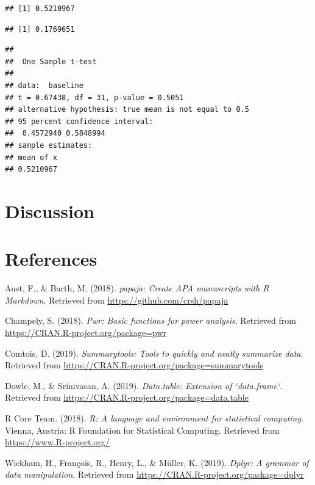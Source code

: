\documentclass[man]{apa6}
\begin{document}
\begin{verbatim}
## [1] 0.5210967
\end{verbatim}

\begin{verbatim}
## [1] 0.1769651
\end{verbatim}

\begin{verbatim}
## 
##  One Sample t-test
## 
## data:  baseline
## t = 0.67438, df = 31, p-value = 0.5051
## alternative hypothesis: true mean is not equal to 0.5
## 95 percent confidence interval:
##  0.4572940 0.5848994
## sample estimates:
## mean of x 
## 0.5210967
\end{verbatim}

\section{Discussion}\label{discussion}

\newpage

\section{References}\label{references}

\begingroup
\setlength{\parindent}{-0.5in} \setlength{\leftskip}{0.5in}

\hypertarget{refs}{}
\hypertarget{ref-R-papaja}{}
Aust, F., \& Barth, M. (2018). \emph{papaja: Create APA manuscripts with
R Markdown}. Retrieved from \url{https://github.com/crsh/papaja}

\hypertarget{ref-R-pwr}{}
Champely, S. (2018). \emph{Pwr: Basic functions for power analysis}.
Retrieved from \url{https://CRAN.R-project.org/package=pwr}

\hypertarget{ref-R-summarytools}{}
Comtois, D. (2019). \emph{Summarytools: Tools to quickly and neatly
summarize data}. Retrieved from
\url{https://CRAN.R-project.org/package=summarytools}

\hypertarget{ref-R-data.table}{}
Dowle, M., \& Srinivasan, A. (2019). \emph{Data.table: Extension of
`data.frame`}. Retrieved from
\url{https://CRAN.R-project.org/package=data.table}

\hypertarget{ref-R-base}{}
R Core Team. (2018). \emph{R: A language and environment for statistical
computing}. Vienna, Austria: R Foundation for Statistical Computing.
Retrieved from \url{https://www.R-project.org/}

\hypertarget{ref-R-dplyr}{}
Wickham, H., François, R., Henry, L., \& Müller, K. (2019). \emph{Dplyr:
A grammar of data manipulation}. Retrieved from
\url{https://CRAN.R-project.org/package=dplyr}

\endgroup
\end{document}
